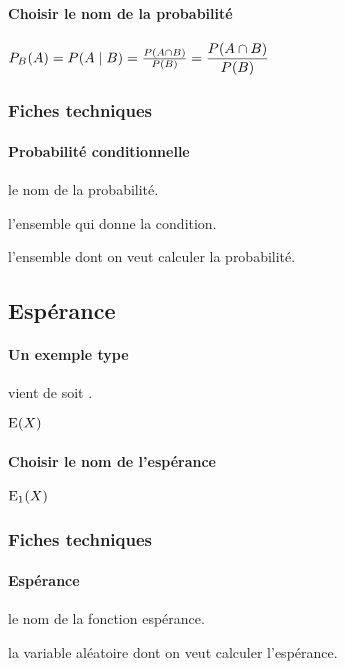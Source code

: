 \documentclass[12pt,a4paper]{article}
\begin{document}
\paragraph{Choisir le nom de la probabilité}

\begin{latexex}
$\probacond[P]{B}{A}
 =
 \probacond*[P]{B}{A}
 =
 \probacond**[P]{B}{A}
 =
 \dprobacond**[P]{B}{A}$
\end{latexex}




\subsubsection{Fiches techniques}

\paragraph{Probabilité conditionnelle}





\IDoption{} le nom de la probabilité.

 l'ensemble qui donne la condition.

 l'ensemble dont on veut calculer la probabilité.




\subsection{Espérance}

\paragraph{Un exemple type}

 vient de   soit .
\begin{latexex}
$\expval{X}$
\end{latexex}




\paragraph{Choisir le nom de l'espérance}

\begin{latexex}
$\expval[E_1]{X}$
\end{latexex}




\subsubsection{Fiches techniques}

\paragraph{Espérance}


\IDoption{} le nom de la fonction espérance.

\IDarg{} la variable aléatoire dont on veut calculer l'espérance.
\end{document}
